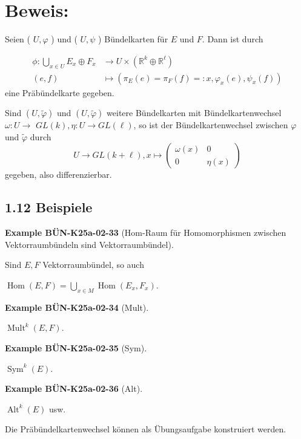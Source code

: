 \documentclass[10pt, letterpaper]{article}
\newcommand{\CustomHeading}[3]{%
  \par\medskip\noindent%
  \textbf{#1 #2} \textnormal{(#3)}.\enskip%
}
\newenvironment{EXA}[2]{\begin{unitbox}\CustomHeading{Example}{#1}{#2}}{\end{unitbox}}
\begin{document}
\section*{Beweis:}
Seien ( $U, \varphi$ ) und ( $U, \psi$ ) Bündelkarten für $E$ und $F$. Dann ist durch

$$
\begin{aligned}
\phi: \bigcup_{x \in U} E_{x} \oplus F_{x} & \rightarrow U \times\left(\mathbb{R}^{k} \oplus \mathbb{R}^{\ell}\right) \\
(e, f) & \mapsto\left(\pi_{E}(e)=\pi_{F}(f)=: x, \varphi_{x}(e), \psi_{x}(f)\right)
\end{aligned}
$$
eine Präbündelkarte gegeben.

Sind $(U, \tilde{\varphi})$ und $(U, \tilde{\varphi})$ weitere Bündelkarten mit Bündelkartenwechsel $\omega: U \rightarrow$ $G L(k), \eta: U \rightarrow G L(\ell)$, so ist der Bündelkartenwechsel zwischen $\varphi$ und $\tilde{\varphi}$ durch
$$
U \rightarrow G L(k+\ell), x \mapsto\left(\begin{array}{cc}
\omega(x) & 0 \\
0 & \eta(x)
\end{array}\right)
$$
gegeben, also differenzierbar.


\subsection*{1.12 Beispiele}

\begin{EXA}{BÜN-K25a-02-33}{Hom-Raum für Homomorphismen zwischen Vektorraumbündeln sind Vektorraumbündel}
Sind $E, F$ Vektorraumbündel, so auch

$\operatorname{Hom}(E, F)=\bigcup_{x \in M} \operatorname{Hom}\left(E_{x}, F_{x}\right)$.
\end{EXA}

\begin{EXA}{BÜN-K25a-02-34}{Mult}
$\operatorname{Mult}^{k}(E, F)$.
\end{EXA}

\begin{EXA}{BÜN-K25a-02-35}{Sym}
$\operatorname{Sym}^{k}(E)$.
\end{EXA}

\begin{EXA}{BÜN-K25a-02-36}{Alt}
$\operatorname{Alt}^{k}(E)$ usw.
\end{EXA}

Die Präbündelkartenwechsel können als Übungsaufgabe konstruiert werden.
\end{document}
